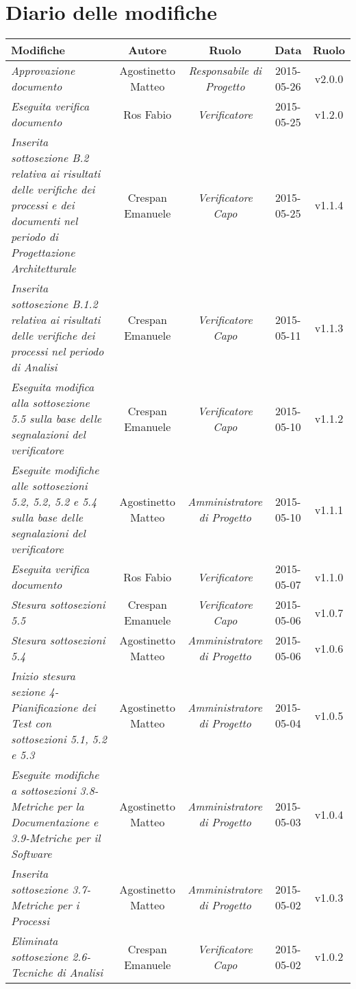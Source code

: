 \newpage
\section*{Diario delle modifiche}

\begin{table}[h]
\centering
\begin{tabular}{|p{}|c|c|c|c|}
	\toprule
		\textbf{Modifiche} & \textbf{Autore} & \textbf{Ruolo} & \textbf{Data} & \textbf{Ruolo} \\
	\midrule
	\midrule
		\textit{Approvazione documento} & Agostinetto Matteo & \textit{Responsabile di Progetto} & 2015-05-26 & v2.0.0 \\
	\midrule
		\textit{Eseguita verifica documento} & Ros Fabio & \textit{Verificatore} & 2015-05-25 & v1.2.0 \\	
	\midrule
		\textit{Inserita sottosezione B.2 relativa ai risultati delle verifiche dei processi e dei documenti nel periodo di Progettazione Architetturale} & Crespan Emanuele & \textit{Verificatore Capo} & 2015-05-25 & v1.1.4 \\
	\midrule
		\textit{Inserita sottosezione B.1.2 relativa ai risultati delle verifiche dei processi nel periodo di Analisi} & Crespan Emanuele & \textit{Verificatore Capo} & 2015-05-11 & v1.1.3 \\
	\midrule
		\textit{Eseguita modifica alla sottosezione 5.5 sulla base delle segnalazioni del verificatore} & Crespan Emanuele & \textit{Verificatore Capo} & 2015-05-10 & v1.1.2 \\
	\midrule
		\textit{Eseguite modifiche alle sottosezioni 5.2, 5.2, 5.2 e 5.4 sulla base delle segnalazioni del verificatore} & Agostinetto Matteo & \textit{Amministratore di Progetto} & 2015-05-10 & v1.1.1 \\
	\midrule
		\textit{Eseguita verifica documento} & Ros Fabio & \textit{Verificatore} & 2015-05-07 & v1.1.0 \\
	\midrule
		\textit{Stesura sottosezioni 5.5} & Crespan Emanuele & \textit{Verificatore Capo} & 2015-05-06 & v1.0.7 \\
	\midrule
		\textit{Stesura sottosezioni 5.4} & Agostinetto Matteo & \textit{Amministratore di Progetto} & 2015-05-06 & v1.0.6 \\
	\midrule
		\textit{Inizio stesura sezione 4-Pianificazione dei Test con sottosezioni 5.1, 5.2 e 5.3} & Agostinetto Matteo & \textit{Amministratore di Progetto} & 2015-05-04 & v1.0.5 \\
	\midrule
		\textit{Eseguite modifiche a sottosezioni 3.8-Metriche per la Documentazione e 3.9-Metriche per il Software} & Agostinetto Matteo & \textit{Amministratore di Progetto} & 2015-05-03 & v1.0.4 \\
	\midrule
		\textit{Inserita sottosezione 3.7-Metriche per i Processi} & Agostinetto Matteo & \textit{Amministratore di Progetto} & 2015-05-02 & v1.0.3 \\
	\midrule
		\textit{Eliminata sottosezione 2.6-Tecniche di Analisi} & Crespan Emanuele & \textit{Verificatore Capo} & 2015-05-02 & v1.0.2 \\
	\bottomrule
\end{tabular}	
\end{table}

